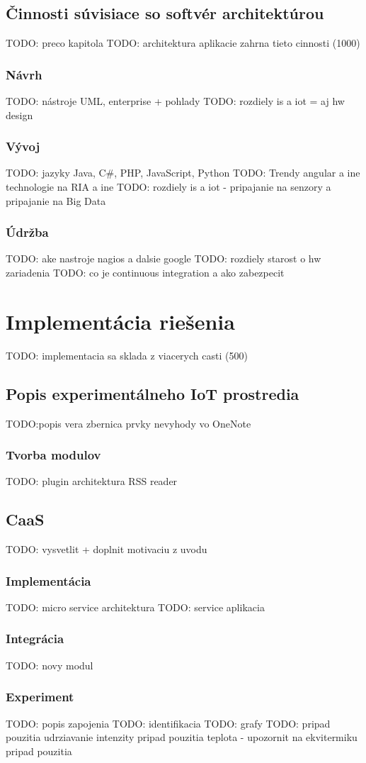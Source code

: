 \subsection{Činnosti súvisiace so softvér architektúrou}
TODO: preco kapitola 
TODO: architektura aplikacie zahrna tieto cinnosti (1000)
\subsubsection{Návrh}
TODO: nástroje UML, enterprise + pohlady
TODO: rozdiely is a iot = aj hw design 
\subsubsection{Vývoj}
TODO: jazyky Java, C\#, PHP, JavaScript, Python
TODO: Trendy angular a ine technologie na RIA a ine 
TODO: rozdiely is a iot - pripajanie na senzory a pripajanie na Big Data
\subsubsection{Údržba}
TODO: ake nastroje nagios a dalsie google
TODO: rozdiely starost o hw zariadenia
TODO: co je continuous integration a ako zabezpecit


\section{Implementácia riešenia}
TODO: implementacia sa sklada z viacerych casti (500)
\subsection{Popis experimentálneho IoT prostredia}
TODO:popis
vera 
zbernica 
prvky
nevyhody vo OneNote

\subsubsection{Tvorba modulov}
TODO: plugin architektura RSS reader
\subsection{CaaS}
TODO: vysvetlit + doplnit motivaciu z uvodu
\subsubsection{Implementácia}
TODO: micro service architektura
TODO: service aplikacia
\subsubsection{Integrácia}
TODO: novy modul
\subsubsection{Experiment}
TODO: popis zapojenia
TODO: identifikacia
TODO: grafy
TODO: 
pripad pouzitia udrziavanie intenzity
pripad pouzitia teplota - upozornit na ekvitermiku
pripad pouzitia
